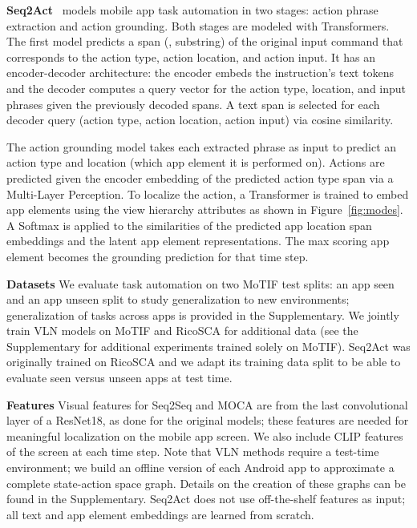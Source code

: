 \smallskip

\noindent\textbf{Seq2Act}~\cite{li-etal-2020-mapping} %
models mobile app task automation in two stages: action phrase extraction and action grounding. Both stages are modeled with Transformers. 
The first model predicts a span (\ie, substring) of the original input command that corresponds to the action type, action location, and action input. 
It has an encoder-decoder architecture: the encoder embeds the instruction's text tokens and the decoder computes a query vector for the action type, location, and input phrases 
given the previously decoded spans. A text span is selected for each decoder query (action type, action location, action input) via cosine similarity. 

The action grounding model takes each extracted phrase as input to predict an action type and location (which app element it is performed on). Actions are predicted given the encoder embedding of the predicted action type span via a Multi-Layer Perception. To localize the action, a Transformer is trained to embed app elements using the view hierarchy attributes as shown in Figure~\ref{fig:modes}.
A Softmax is applied to the similarities of the predicted app location span embeddings and the latent app element representations. 
The max scoring app element becomes the grounding prediction for that time step.
\smallskip

\noindent\textbf{Datasets} We evaluate task automation on two MoTIF test splits: an app seen and an app unseen split to study generalization to new environments; generalization of tasks across apps is provided in the Supplementary. We jointly train VLN models on MoTIF and RicoSCA for additional data (see the Supplementary for additional experiments trained solely on MoTIF). Seq2Act was originally trained on RicoSCA and we adapt its training data split to be able to evaluate seen versus unseen apps at test time.
\smallskip

\noindent\textbf{Features} Visual features for Seq2Seq and MOCA are from the last convolutional layer of a ResNet18, as done for the original models; these features are needed for meaningful localization on the mobile app screen.
We also include CLIP features of the screen at each time step. Note that VLN methods require a test-time environment; we build an offline version of each Android app to approximate a complete state-action space graph. Details on the creation of these graphs can be found in the Supplementary. Seq2Act does not use off-the-shelf features as input; all text and app element embeddings are learned from scratch. 

